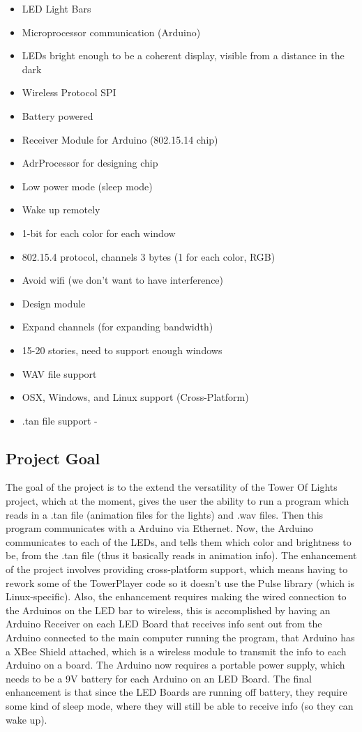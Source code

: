 \documentclass[12pt]{article}
\begin{document}
{{		\begin{itemize}
			\item LED Light Bars
			\item Microprocessor communication (Arduino)
			\item LEDs bright enough to be a coherent display, visible from a distance in the dark
			\item Wireless Protocol SPI
			\item Battery powered
			\item Receiver Module for Arduino (802.15.14 chip) 
			\item AdrProcessor for designing chip
			\item Low power mode (sleep mode)
			\item Wake up remotely
			\item 1-bit for each color for each window
			\item 802.15.4 protocol, channels 3 bytes (1 for each color, RGB)
			\item Avoid wifi (we don't want to have interference)
			\item Design module
			\item Expand channels (for expanding bandwidth)
			\item 15-20 stories, need to support enough windows
			\item WAV file support
			\item OSX, Windows, and Linux support (Cross-Platform)
			\item .tan file support - 
		\end{itemize}
	
	\subsection{Project Goal}
	The goal of the project is to the extend the versatility of the Tower Of Lights project, which at the moment, gives the user the ability to run a program which reads in a .tan file (animation files for the lights) and .wav files. Then this
	program communicates with a Arduino via Ethernet. Now, the Arduino communicates to each of the LEDs, and tells them which
	color and brightness to be, from the .tan file (thus it basically reads in animation info). 
	The enhancement of the project involves providing cross-platform support, which means having to rework some of the TowerPlayer code so it doesn't use the Pulse library (which is Linux-specific). Also, the enhancement requires making the wired connection to the Arduinos on the LED bar to wireless, this is accomplished by having an Arduino Receiver on each LED Board that receives info sent out from the Arduino connected to the main computer running the program, that Arduino has a XBee Shield attached, which is a wireless module to transmit the info to each Arduino on a board. The Arduino now requires a portable power supply, which needs to be a 9V battery for each Arduino on an LED Board. The final enhancement is that since the LED Boards are running off battery, they require some kind of sleep mode, where they will still be able to receive info (so they can wake up).\\
	
}}
\end{document}
